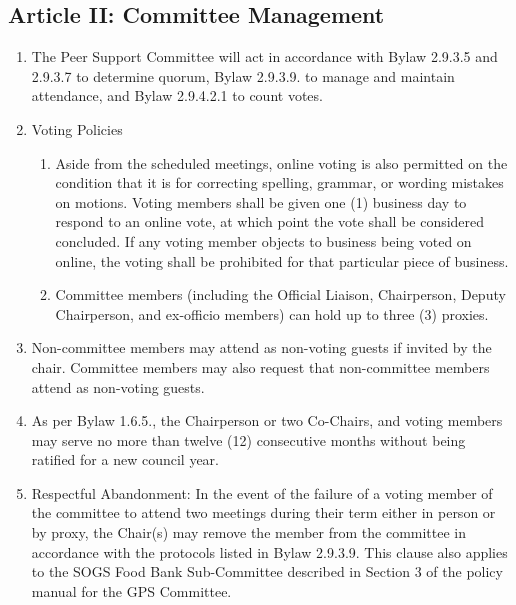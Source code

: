 \subsection{Article II: Committee Management}
\begin{enumerate}[label*=\arabic*., align=left]	
\item The Peer Support Committee will act in accordance with Bylaw 2.9.3.5 and 2.9.3.7 to determine quorum, Bylaw 2.9.3.9. to manage and maintain attendance, and Bylaw 2.9.4.2.1 to count votes.
\item Voting Policies
\begin{enumerate}[label*=\arabic*., align=left]	
\item Aside from the scheduled meetings, online voting is also permitted on the condition that it is for correcting spelling, grammar, or wording mistakes on motions. Voting members shall be given one (1) business day to respond to an online vote, at which point the vote shall be considered concluded. If any voting member objects to business being voted on online, the voting shall be prohibited for that particular piece of business.
\item Committee members (including the Official Liaison, Chairperson, Deputy Chairperson, and ex-officio members) can hold up to three (3) proxies.
\end{enumerate}
\item Non-committee members may attend as non-voting guests if invited by the chair. Committee members may also request that non-committee members attend as non-voting guests. 
\item As per Bylaw 1.6.5., the Chairperson or two Co-Chairs, and voting members may serve no more than twelve (12) consecutive months without being ratified for a new council year.
\item Respectful Abandonment: In the event of the failure of a voting member of the committee to attend two meetings during their term either in person or by proxy, the Chair(s) may remove the member from the committee in accordance with the protocols listed in Bylaw 2.9.3.9. This clause also applies to the SOGS Food Bank Sub-Committee described in Section 3 of the policy manual for the GPS Committee.
\end{enumerate}

